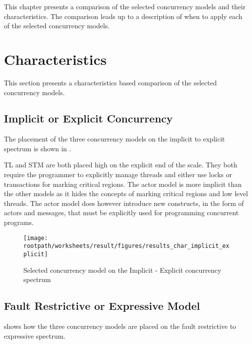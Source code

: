 \makeatletter {}\makeatother
{}
This chapter presents a comparison of the selected concurrency models and their characteristics. The comparison leads up to a description of when to apply each of the selected concurrency models.
\label{chap:results}

\section{Characteristics}
This section presents a characteristics based comparison of the selected concurrency models.

\subsection{Implicit or Explicit Concurrency}
The placement of the three concurrency models on the implicit to explicit spectrum is shown in .

\ac{TL} and \ac{STM} are both placed high on the explicit end of the scale. They both require the programmer to explicitly manage threads and either use locks or transactions for marking critical regions. The actor model is more implicit than the other models as it hides the concepts of marking critical regions and low level threads. The actor model does however introduce new constructs, in the form of actors and messages, that must be explicitly used for programming concurrent programs.

\begin{figure}[htbp]
\centering
 \texttt{[image: \\rootpath/worksheets/result/figures/results\_char\_implicit\_explicit]} 
 \caption{Selected concurrency model on the Implicit - Explicit concurrency spectrum}
\label{fig:results_char_impli_expli}
\end{figure}

\subsection{Fault Restrictive or Expressive Model}
 shows how the three concurrency models are placed on the fault restrictive to expressive spectrum.


